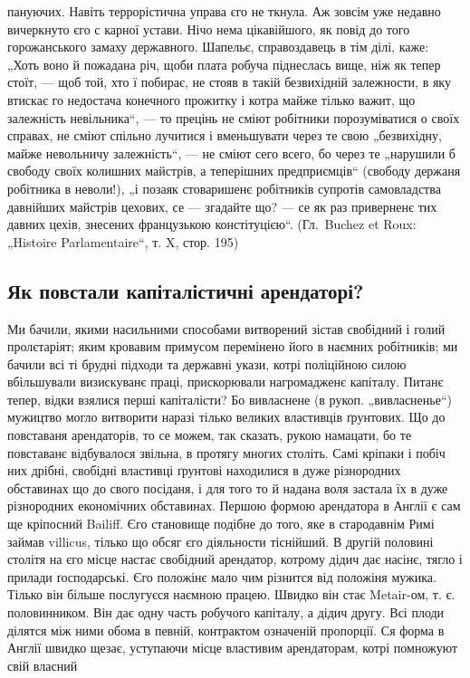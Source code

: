 \parcont{}
пануючих. Навіть террорістична управа єго не ткнула. Аж
зовсім уже недавно вичеркнуто єго с карної устави. Нічо
нема цікавійшого, як повід до того горожанського замаху
державного. Шапельє, справоздавець в тім ділі, каже: „Хоть
воно й пожадана річ, щоби плата робуча піднеслась вище,
ніж як тепер стоїт, — щоб той, хто ї побирає, не стояв
в такій безвихідній залежности, в яку втискає го недостача
конечного прожитку і котра майже тілько важит, що залежність
невільника“, — то прецінь не сміют робітники
порозуміватися о своїх справах, не сміют спільно лучитися
і вменьшувати через те свою „безвихідну, майже невольничу
залежність“, — не сміют сего всего, бо через те „нарушили б
свободу своїх колишних майстрів, а теперішних
предприємців“ (свободу держаня робітника в неволи!), „і позаяк
стоваришенє робітників супротів самовладства давнійших
майстрів цехових, се — згадайте що? — се як раз приверненє
тих давних цехів, знесених французькою констітуцією“.
(Гл.~Buchez et Roux: „Histoire Parlamentaire“, т. X,
стор. 195)

\subsection{Як повстали капіталістичні арендаторі?}

Ми бачили, якими насильними способами витворений
зістав свобідний і голий пролєтаріят; яким кровавим примусом
перемінено його в наємних робітників; ми бачили всі
ті брудні підходи та державні укази, котрі поліційною силою
вбільшували визискуванє праці, прискорювали нагромадженє
капіталу. Питанє тепер, відки взялися перші капіталісти?
Бо вивласнене (в рукоп. „вивласненье“) мужицтво
могло витворити наразі тілько великих властивців ґрунтових.
Що до повставаня арендаторів, то се можем, так сказать, рукою
намацати, бо те повставанє відбувалося звільна, в протягу
многих століть. Самі кріпаки і побіч них дрібні, свобідні
властивці ґрунтові находилися в дуже різнородних обставинах
що до свого посіданя, і для того то й надана воля
застала їх в дуже різнородних економічних обставинах.
Першою формою арендатора в Англії є сам ще кріпосний
Bailiff. Єго становище подібне до того, яке в стародавнім
Римі займав villicus, тілько що обсяг єго діяльности тіснійший.
В другій половині  столітя на єго місце настає свобідний
арендатор, котрому дідич дає насінє, тягло і прилади
ґосподарські. Єго положінє мало чим різнится від
положіня мужика. Тілько він більше послугуєся наємною
працею. Швидко він стає Metair-ом, т. є. половинником. Він
дає одну часть робучого капіталу, а дідич другу. Всі плоди
ділятся між ними обома в певній, контрактом означеній
пропорції. Ся форма в Англії швидко щезає, уступаючи
місце властивим арендаторам, котрі помножуют свій власний
\parbreak{}
